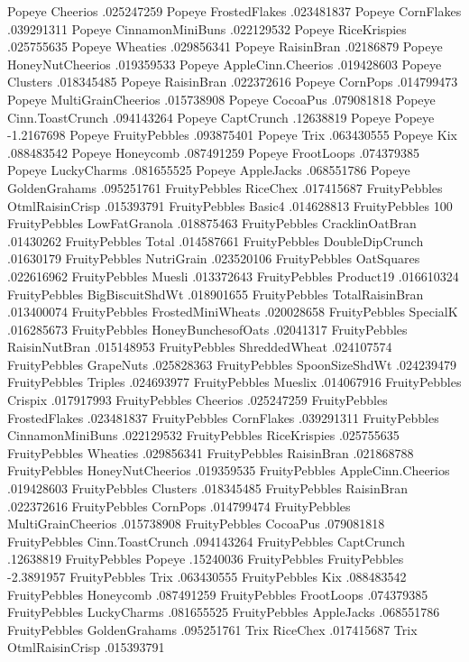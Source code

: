 Popeye	Cheerios	.025247259
Popeye	FrostedFlakes	.023481837
Popeye	CornFlakes	.039291311
Popeye	CinnamonMiniBuns	.022129532
Popeye	RiceKrispies	.025755635
Popeye	Wheaties	.029856341
Popeye	RaisinBran	.02186879
Popeye	HoneyNutCheerios	.019359533
Popeye	AppleCinn.Cheerios	.019428603
Popeye	Clusters	.018345485
Popeye	RaisinBran	.022372616
Popeye	CornPops	.014799473
Popeye	MultiGrainCheerios	.015738908
Popeye	CocoaPus	.079081818
Popeye	Cinn.ToastCrunch	.094143264
Popeye	CaptCrunch	.12638819
Popeye	Popeye	-1.2167698
Popeye	FruityPebbles	.093875401
Popeye	Trix	.063430555
Popeye	Kix	.088483542
Popeye	Honeycomb	.087491259
Popeye	FrootLoops	.074379385
Popeye	LuckyCharms	.081655525
Popeye	AppleJacks	.068551786
Popeye	GoldenGrahams	.095251761
FruityPebbles	RiceChex	.017415687
FruityPebbles	OtmlRaisinCrisp	.015393791
FruityPebbles	Basic4	.014628813
FruityPebbles	100%
FruityPebbles	LowFatGranola	.018875463
FruityPebbles	CracklinOatBran	.01430262
FruityPebbles	Total	.014587661
FruityPebbles	DoubleDipCrunch	.01630179
FruityPebbles	NutriGrain	.023520106
FruityPebbles	OatSquares	.022616962
FruityPebbles	Muesli	.013372643
FruityPebbles	Product19	.016610324
FruityPebbles	BigBiscuitShdWt	.018901655
FruityPebbles	TotalRaisinBran	.013400074
FruityPebbles	FrostedMiniWheats	.020028658
FruityPebbles	SpecialK	.016285673
FruityPebbles	HoneyBunchesofOats	.02041317
FruityPebbles	RaisinNutBran	.015148953
FruityPebbles	ShreddedWheat	.024107574
FruityPebbles	GrapeNuts	.025828363
FruityPebbles	SpoonSizeShdWt	.024239479
FruityPebbles	Triples	.024693977
FruityPebbles	Mueslix	.014067916
FruityPebbles	Crispix	.017917993
FruityPebbles	Cheerios	.025247259
FruityPebbles	FrostedFlakes	.023481837
FruityPebbles	CornFlakes	.039291311
FruityPebbles	CinnamonMiniBuns	.022129532
FruityPebbles	RiceKrispies	.025755635
FruityPebbles	Wheaties	.029856341
FruityPebbles	RaisinBran	.021868788
FruityPebbles	HoneyNutCheerios	.019359535
FruityPebbles	AppleCinn.Cheerios	.019428603
FruityPebbles	Clusters	.018345485
FruityPebbles	RaisinBran	.022372616
FruityPebbles	CornPops	.014799474
FruityPebbles	MultiGrainCheerios	.015738908
FruityPebbles	CocoaPus	.079081818
FruityPebbles	Cinn.ToastCrunch	.094143264
FruityPebbles	CaptCrunch	.12638819
FruityPebbles	Popeye	.15240036
FruityPebbles	FruityPebbles	-2.3891957
FruityPebbles	Trix	.063430555
FruityPebbles	Kix	.088483542
FruityPebbles	Honeycomb	.087491259
FruityPebbles	FrootLoops	.074379385
FruityPebbles	LuckyCharms	.081655525
FruityPebbles	AppleJacks	.068551786
FruityPebbles	GoldenGrahams	.095251761
Trix	RiceChex	.017415687
Trix	OtmlRaisinCrisp	.015393791
